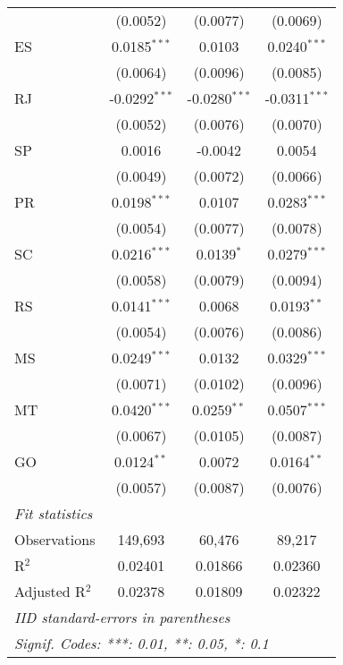 \begin{tabular}{lccc}
                   & (0.0052)                       & (0.0077)                & (0.0069)\\   
   ES              & 0.0185$^{***}$                 & 0.0103                  & 0.0240$^{***}$\\   
                   & (0.0064)                       & (0.0096)                & (0.0085)\\   
   RJ              & -0.0292$^{***}$                & -0.0280$^{***}$         & -0.0311$^{***}$\\   
                   & (0.0052)                       & (0.0076)                & (0.0070)\\   
   SP              & 0.0016                         & -0.0042                 & 0.0054\\   
                   & (0.0049)                       & (0.0072)                & (0.0066)\\   
   PR              & 0.0198$^{***}$                 & 0.0107                  & 0.0283$^{***}$\\   
                   & (0.0054)                       & (0.0077)                & (0.0078)\\   
   SC              & 0.0216$^{***}$                 & 0.0139$^{*}$            & 0.0279$^{***}$\\   
                   & (0.0058)                       & (0.0079)                & (0.0094)\\   
   RS              & 0.0141$^{***}$                 & 0.0068                  & 0.0193$^{**}$\\   
                   & (0.0054)                       & (0.0076)                & (0.0086)\\   
   MS              & 0.0249$^{***}$                 & 0.0132                  & 0.0329$^{***}$\\   
                   & (0.0071)                       & (0.0102)                & (0.0096)\\   
   MT              & 0.0420$^{***}$                 & 0.0259$^{**}$           & 0.0507$^{***}$\\   
                   & (0.0067)                       & (0.0105)                & (0.0087)\\   
   GO              & 0.0124$^{**}$                  & 0.0072                  & 0.0164$^{**}$\\   
                   & (0.0057)                       & (0.0087)                & (0.0076)\\   
   \midrule
   \emph{Fit statistics}\\
   Observations    & 149,693                        & 60,476                  & 89,217\\  
   R$^2$           & 0.02401                        & 0.01866                 & 0.02360\\  
   Adjusted R$^2$  & 0.02378                        & 0.01809                 & 0.02322\\  
   \midrule \midrule
   \multicolumn{4}{l}{\emph{IID standard-errors in parentheses}}\\
   \multicolumn{4}{l}{\emph{Signif. Codes: ***: 0.01, **: 0.05, *: 0.1}}\\
\end{tabular}
\par\endgroup


